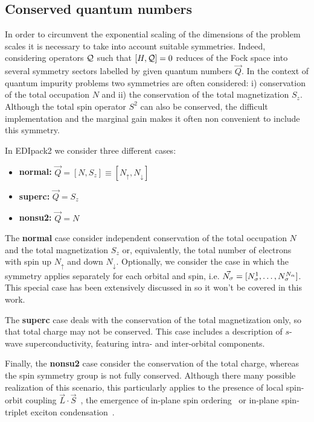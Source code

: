 \documentclass[final,3p,10pt]{elsarticle}
\newcommand{\onlinecite}[1]{\nocite{#1}\hspace{-0.1cm}\citenum{#1}}
\def\a{\alpha}       \def\b{\beta}   \def\g{\gamma}   \def\d{\delta}
\def\up{\uparrow} \def\down{\downarrow} \def\dw{\downarrow}
\def\NAME{{\rm EDIpack2 }}
\begin{document}
\subsection{Conserved quantum numbers}\label{sSecQNs}
In order to circumvent the exponential scaling of the dimensions of
the problem scales it is necessary to take into account suitable symmetries.
Indeed, considering operators ${\cal Q}$ such that $[H, {\cal Q}]=0$
reduces of the Fock space into several symmetry sectors
labelled by given quantum numbers $\vec{Q}$. 
In the context of quantum impurity problems two symmetries are often considered: i)
conservation of the total occupation $N$ and ii) the
conservation of the total magnetization $S_z$. Although the total spin
operator $S^2$ can also be conserved, the difficult  implementation
and the marginal gain makes it often non convenient to include this symmetry.

In \NAME we consider three different cases:
\begin{itemize}
\item{\bf normal:}  $\vec{Q}=[N,S_z]\equiv[N_\up,N_\dw]$
\item{\bf superc:}  $\vec{Q}=S_z$
\item{\bf nonsu2:} $\vec{Q}=N$
\end{itemize}

The {\bf normal} case consider independent conservation of the total occupation $N$
and the total magnetization $S_z$ or, equivalently, the total number of electrons with spin up $N_\up$ and down
$N_\dw$. Optionally, we consider the case in which the symmetry
applies separately for each orbital and spin,
i.e. $\vec{N_\s}=[N^1_\s,\dots,N^{N_\a}_\s]$. This special case has been
extensively discussed in \onlinecite{Amaricci2022} so it won't be covered in
this work.

The {\bf superc} case deals with the conservation of the total
magnetization only, so that total charge may not be conserved. This
case includes a description of $s$-wave superconductivity, featuring
intra- and inter-orbital components.

Finally, the {\bf nonsu2} case consider the conservation of the total
charge, whereas the spin symmetry group is not fully
conserved. Although there many possible realization of this scenario,
this particularly applies to the presence of local spin-orbit coupling
$\vec{L}\cdot\vec{S}$~\cite{something}, the emergence of in-plane spin ordering~\cite{KM} or
in-plane spin-triplet exciton condensation~\cite{ExcitonPRB,Amaricci,Blason}.  
\end{document}

